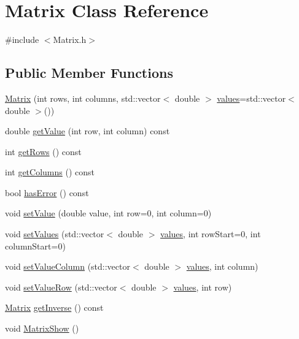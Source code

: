 \hypertarget{classMatrix}{}\section{Matrix Class Reference}
\label{classMatrix}


{\ttfamily \#include $<$Matrix.\+h$>$}

\subsection*{Public Member Functions}
\begin{DoxyCompactItemize}
\item 
\hyperlink{classMatrix_a5d39846f7d1e7f2f0ca9cb49117221e1}{Matrix} (int rows, int columns, std\+::vector$<$ double $>$ \hyperlink{classMatrix_a5987175ae045377790ff0b1f6cfd2e7b}{values}=std\+::vector$<$ double $>$())
\item 
double \hyperlink{classMatrix_ab752671c6461d950962e151a1af251ce}{get\+Value} (int row, int column) const
\item 
int \hyperlink{classMatrix_ad1b2433d295efcbf371e6f636db757e9}{get\+Rows} () const
\item 
int \hyperlink{classMatrix_a37d08315d9b28e5922e1a75b4d2a4cb9}{get\+Columns} () const
\item 
bool \hyperlink{classMatrix_abf6343d2b9345e08ef800fbc8f19e34e}{has\+Error} () const
\item 
void \hyperlink{classMatrix_a8271fe6ec51ea43fdf77f4b7f96333d9}{set\+Value} (double value, int row=0, int column=0)
\item 
void \hyperlink{classMatrix_a14c65630cbfab56ef5a99c793cca3dba}{set\+Values} (std\+::vector$<$ double $>$ \hyperlink{classMatrix_a5987175ae045377790ff0b1f6cfd2e7b}{values}, int row\+Start=0, int column\+Start=0)
\item 
void \hyperlink{classMatrix_a1c77e71a031b6f116b9dfa328f70009b}{set\+Value\+Column} (std\+::vector$<$ double $>$ \hyperlink{classMatrix_a5987175ae045377790ff0b1f6cfd2e7b}{values}, int column)
\item 
void \hyperlink{classMatrix_a0c70a6fc13e5b41d473bcdde7af1da11}{set\+Value\+Row} (std\+::vector$<$ double $>$ \hyperlink{classMatrix_a5987175ae045377790ff0b1f6cfd2e7b}{values}, int row)
\item 
\hyperlink{classMatrix}{Matrix} \hyperlink{classMatrix_ade3fcddb0cc6a7e221a94e13afc7752c}{get\+Inverse} () const
\item 
void \hyperlink{classMatrix_a3c6fbdb8a8073ec2b2000614777ae930}{Matrix\+Show} ()
\end{DoxyCompactItemize}
